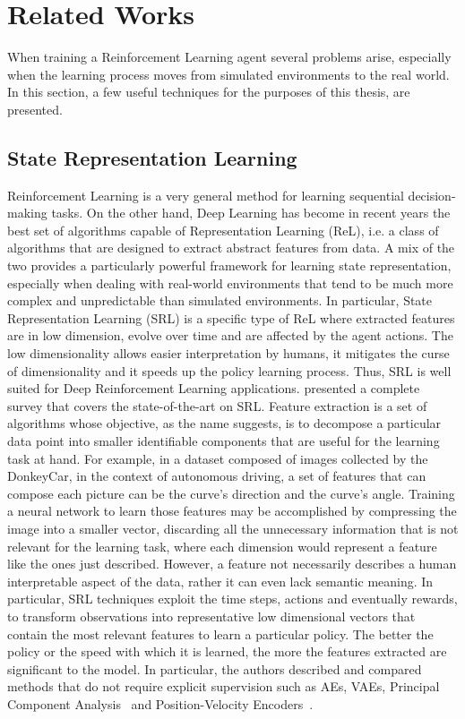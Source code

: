\chapter{Related Works}

When training a Reinforcement Learning agent several problems arise, especially when the learning process moves from simulated environments to the real world. In this section, a few useful techniques for the purposes of this thesis, are presented.

\section{State Representation Learning} \label{sec:srl}
Reinforcement Learning is a very general method for learning sequential decision-making tasks. On the other hand, Deep Learning has become in recent years the best set of algorithms capable of Representation Learning (ReL), i.e. a class of algorithms that are designed to extract abstract features from data. A mix of the two provides a particularly powerful framework for learning state representation, especially when dealing with real-world environments that tend to be much more complex and unpredictable than simulated environments. In particular, State Representation Learning (SRL) is a specific type of ReL where extracted features are in low dimension, evolve over time and are affected by the agent actions. The low dimensionality allows easier interpretation by humans, it mitigates the curse of dimensionality and it speeds up the policy learning process. Thus, SRL is well suited for Deep Reinforcement Learning applications. \citet{DBLP:journals/corr/abs-1802-04181} presented a complete survey that covers the state-of-the-art on SRL. Feature extraction is a set of algorithms whose objective, as the name suggests, is to decompose a particular data point into smaller identifiable components that are useful for the learning task at hand. For example, in a dataset composed of images collected by the DonkeyCar, in the context of autonomous driving, a set of features that can compose each picture can be the curve's direction and the curve's angle. Training a neural network to learn those features may be accomplished by compressing the image into a smaller vector, discarding all the unnecessary information that is not relevant for the learning task, where each dimension would represent a feature like the ones just described. However, a feature not necessarily describes a human interpretable aspect of the data, rather it can even lack semantic meaning. In particular, SRL techniques exploit the time steps, actions and eventually rewards, to transform observations into representative low dimensional vectors that contain the most relevant features to learn a particular policy. The better the policy or the speed with which it is learned, the more the features extracted are significant to the model. In particular, the authors described and compared methods that do not require explicit supervision such as AEs, VAEs, Principal Component Analysis~\citep{https://doi.org/10.48550/arxiv.1505.00322} and Position-Velocity Encoders~\citep{DBLP:journals/corr/JonschkowskiHSR17}.

